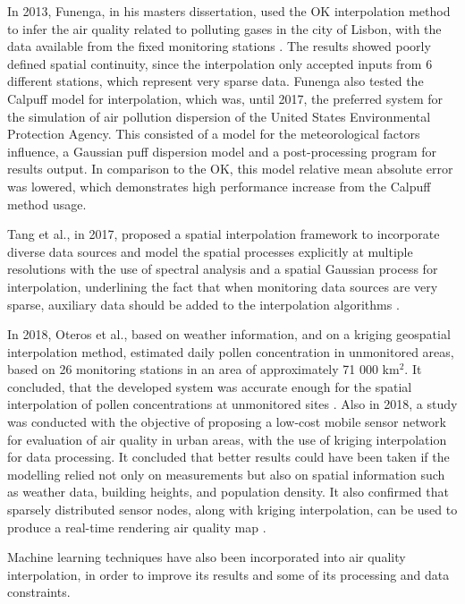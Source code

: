 In 2013, Funenga, in his masters dissertation, used the OK interpolation method to infer the air quality related to polluting gases in the city of Lisbon, with the data available from the fixed monitoring stations \cite{Funenga2013}. The results showed poorly defined spatial continuity, since the interpolation only accepted inputs from 6 different stations, which represent very sparse data. Funenga also tested the Calpuff model for interpolation, which was, until 2017, the preferred system for the simulation of air pollution dispersion of the United States Environmental Protection Agency. This consisted of a model for the meteorological factors influence, a Gaussian puff dispersion model and a post-processing program for results output. In comparison to the OK, this model relative mean absolute error was lowered, which demonstrates high performance increase from the Calpuff method usage.

Tang et al., in 2017, proposed a spatial interpolation framework to incorporate diverse data sources and model the spatial processes explicitly at multiple resolutions with the use of spectral analysis and a spatial Gaussian process for interpolation, underlining the fact that when monitoring data sources are very sparse, auxiliary data should be added to the interpolation algorithms \cite{Tang2017}.

In 2018, Oteros et al., based on weather information, and on a kriging geospatial interpolation method, estimated daily pollen concentration in unmonitored areas, based on 26 monitoring stations in an area of approximately 71 000 km$^{2}$. It concluded, that the developed system was accurate enough for the spatial interpolation of pollen concentrations at unmonitored sites \cite{Oteros2018}.
Also in 2018, a study was conducted with the objective of proposing a low-cost mobile sensor network for evaluation of air quality in urban areas, with the use of kriging interpolation for data processing. It concluded that better results could have been taken if the modelling relied not only on measurements but also on spatial information such as weather data, building heights, and population density. It also confirmed that sparsely distributed sensor nodes, along with kriging interpolation, can be used to produce a real-time rendering air quality map \cite{Makowski}.

Machine learning techniques have also been incorporated into air quality interpolation, in order to improve its results and some of its processing and data constraints. 

